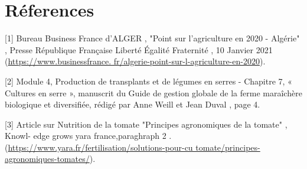\chapter*{Réferences} 
\label{chap:reference} 



[1] Bureau Business France d’ALGER , "Point sur l’agriculture en 2020 - Algérie" , Presse
  République Française Liberté Égalité Fraternité , 10 Janvier 2021 (\url{https://www.businessfrance.
  fr/algerie-point-sur-l-agriculture-en-2020}).\newline

[2]    Module 4, Production de transplants et de légumes en serres - Chapitre 7, « Cultures
  en serre », manuscrit du Guide de gestion globale de la ferme maraîchère biologique et
  diversifiée, rédigé par Anne Weill et Jean Duval , page 4.\newline
  
[3] Article sur Nutrition de la tomate "Principes agronomiques de la tomate" , Knowl-
  edge grows yara france,paraghraph 2 . (\url{https://www.yara.fr/fertilisation/solutions-pour-cu
  tomate/principes-agronomiques-tomates/}).